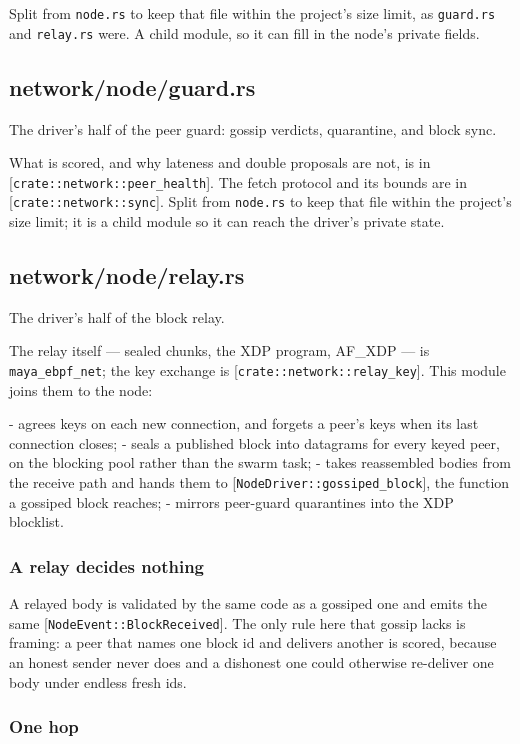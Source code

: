 \documentclass[11pt,a4paper]{article}
\begin{document}
Split from \texttt{node.rs} to keep that file within the project's size limit, as
\texttt{guard.rs} and \texttt{relay.rs} were. A child module, so it can fill in the node's
private fields.

\subsection{network/node/guard.rs}
The driver's half of the peer guard: gossip verdicts, quarantine, and block
sync.

What is scored, and why lateness and double proposals are not, is in
[\texttt{crate::network::peer\_health}]. The fetch protocol and its bounds are in
[\texttt{crate::network::sync}]. Split from \texttt{node.rs} to keep that file within the
project's size limit; it is a child module so it can reach the driver's
private state.

\subsection{network/node/relay.rs}
The driver's half of the block relay.

The relay itself — sealed chunks, the XDP program, AF\_XDP — is
\texttt{maya\_ebpf\_net}; the key exchange is [\texttt{crate::network::relay\_key}]. This
module joins them to the node:

- agrees keys on each new connection, and forgets a peer's keys when its
  last connection closes;
- seals a published block into datagrams for every keyed peer, on the
  blocking pool rather than the swarm task;
- takes reassembled bodies from the receive path and hands them to
  [\texttt{NodeDriver::gossiped\_block}], the function a gossiped block reaches;
- mirrors peer-guard quarantines into the XDP blocklist.

\subsubsection{A relay decides nothing}

A relayed body is validated by the same code as a gossiped one and emits the
same [\texttt{NodeEvent::BlockReceived}]. The only rule here that gossip lacks is
framing: a peer that names one block id and delivers another is scored,
because an honest sender never does and a dishonest one could otherwise
re-deliver one body under endless fresh ids.

\subsubsection{One hop}
\end{document}
